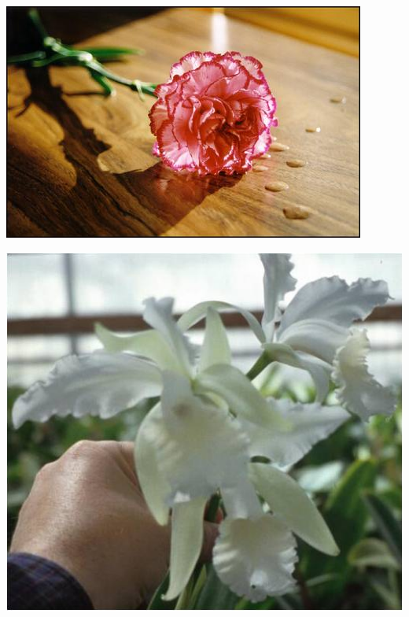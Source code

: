\documentclass{article}
\begin{document}
\begin{center}
\includegraphics[width=0.9\textheight, angle=90]{../Carnation.jpg}
\end{center}
\newpage

\begin{center}
\includegraphics[width=0.9\textheight, angle=90]{../Cattleya.jpg}
\end{center}
\newpage
\end{document}
